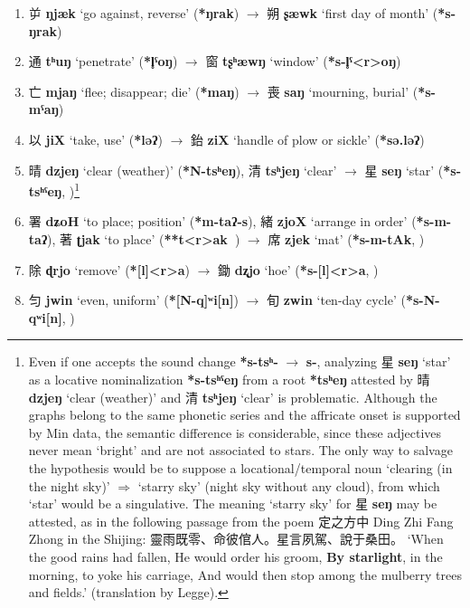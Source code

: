 \documentclass[oneside,a4paper,11pt]{article}
\newcommand{\ipa}[1]{\textbf{{\phon\mbox{#1}}}} %
\newcommand{\zh}[1]{{\cn #1}}
\newcommand{\zhc}[2]{\zh{#1} \ipa{#2}}
\begin{document}
\begin{enumerate}
\item \zhc{屰}{ŋjæk} ‘go against, reverse’ (\ipa{*ŋrak})  $\rightarrow$ \zhc{朔}{ʂæwk} ‘first day of month’  (\ipa{*s-ŋrak})
\item \zhc{通}{tʰuŋ} ‘penetrate’ (\ipa{*l̥ˤoŋ}) $\rightarrow$ \zhc{窗}{tʂʰæwŋ} ‘window’ (\ipa{*s-l̥ˤ<r>oŋ})
\item \zhc{亡}{mjaŋ} ‘flee; disappear; die’ (\ipa{*maŋ}) $\rightarrow$ \zhc{喪}{saŋ} ‘mourning, burial’ (\ipa{*s-mˤaŋ})
\item \zhc{以}{jiX} ‘take, use’ (\ipa{*ləʔ}) $\rightarrow$ \zhc{鈶}{ziX} ‘handle of plow or sickle’ (\ipa{*sə.ləʔ})
\item \zhc{晴}{dzjeŋ} ‘clear (weather)’ (\ipa{*N-tsʰeŋ}), \zhc{清}{tsʰjeŋ} ‘clear'  $\rightarrow$ \zhc{星}{seŋ} `star’ (\ipa{*s-tsʰˤeŋ},  \citealt[139]{bs14oc})\footnote{Even if one accepts the sound change \ipa{*s-tsʰ-} $\rightarrow$ \ipa{s-}, analyzing \zhc{星}{seŋ} `star’ as a locative nominalization \ipa{*s-tsʰˤeŋ} from a root \ipa{*tsʰeŋ} attested by \zhc{晴}{dzjeŋ} ‘clear (weather)’ and \zhc{清}{tsʰjeŋ} ‘clear' is problematic. Although the graphs belong to the same phonetic series and the affricate onset is supported by Min data, the semantic difference is considerable, since these adjectives never mean `bright' and are not associated to stars. The only way to salvage the hypothesis would be to suppose a locational/temporal noun `clearing (in the night sky)' $\Rightarrow$ `starry sky' (night sky without any cloud), from which `star' would be a singulative.
The meaning `starry sky' for \zhc{星}{seŋ} may be attested, as in the following passage from the poem \zh{定之方中} Ding Zhi Fang Zhong in the Shijing: \zh{靈雨既零、命彼倌人。星言夙駕、說于桑田。} `When the good rains had fallen, He would order his groom, \textbf{By starlight}, in the morning, to yoke his carriage, And would then stop among the mulberry trees and fields.' (translation by Legge). } 
\item \zhc{署}{dʑoH} ‘to place; position’ (\ipa{*m-taʔ-s}),  \zhc{緒}{zjoX} ‘arrange in order’ (\ipa{*s-m-taʔ}),  \zhc{著}{ʈjak} ‘to place’ (\ipa{**t<r>ak }) $\rightarrow$  \zhc{席}{zjek} `mat’ (\ipa{*s-m-tAk},  \citealt[61]{bs14oc})
\item \zhc{除}{ɖrjo} ‘remove’ (\ipa{*[l]<r>a}) $\rightarrow$ \zhc{鋤}{dʐjo} ‘hoe’ (\ipa{*s-[l]<r>a}, \citealt[81]{bs14oc})
\item \zhc{匀}{jwin} ‘even, uniform’ (\ipa{*[N-q]ʷi[n]}) $\rightarrow$ \zhc{旬}{zwin} ‘ten-day cycle’ (\ipa{*s-N-qʷi[n]}, \citealt[127]{bs14oc})

\end{enumerate}
\end{document}
